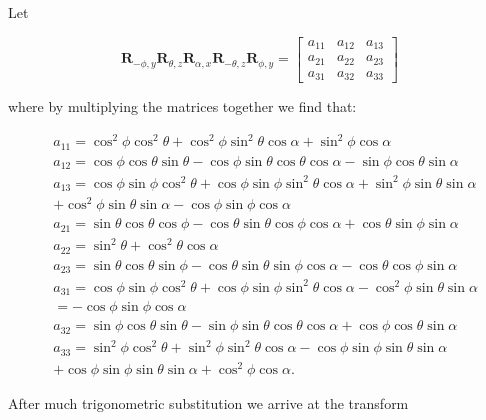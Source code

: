 \documentclass[10pt]{article}
\begin{document}
Let

$$
\mathbf{R}_{-\phi, y} \mathbf{R}_{\theta, z} \mathbf{R}_{\alpha, x} \mathbf{R}_{-\theta, z} \mathbf{R}_{\phi, y}=\left[\begin{array}{lll}
a_{11} & a_{12} & a_{13} \\
a_{21} & a_{22} & a_{23} \\
a_{31} & a_{32} & a_{33}
\end{array}\right]
$$

where by multiplying the matrices together we find that:

$$
\begin{aligned}
& a_{11}=\cos ^{2} \phi \cos ^{2} \theta+\cos ^{2} \phi \sin ^{2} \theta \cos \alpha+\sin ^{2} \phi \cos \alpha \\
& a_{12}=\cos \phi \cos \theta \sin \theta-\cos \phi \sin \theta \cos \theta \cos \alpha-\sin \phi \cos \theta \sin \alpha \\
& a_{13}=\cos \phi \sin \phi \cos ^{2} \theta+\cos \phi \sin \phi \sin ^{2} \theta \cos \alpha+\sin ^{2} \phi \sin \theta \sin \alpha \\
& +\cos ^{2} \phi \sin \theta \sin \alpha-\cos \phi \sin \phi \cos \alpha \\
& a_{21}=\sin \theta \cos \theta \cos \phi-\cos \theta \sin \theta \cos \phi \cos \alpha+\cos \theta \sin \phi \sin \alpha \\
& a_{22}=\sin ^{2} \theta+\cos ^{2} \theta \cos \alpha \\
& a_{23}=\sin \theta \cos \theta \sin \phi-\cos \theta \sin \theta \sin \phi \cos \alpha-\cos \theta \cos \phi \sin \alpha \\
& a_{31}=\cos \phi \sin \phi \cos ^{2} \theta+\cos \phi \sin \phi \sin ^{2} \theta \cos \alpha-\cos ^{2} \phi \sin \theta \sin \alpha \\
& =-\cos \phi \sin \phi \cos \alpha \\
& a_{32}=\sin \phi \cos \theta \sin \theta-\sin \phi \sin \theta \cos \theta \cos \alpha+\cos \phi \cos \theta \sin \alpha \\
& a_{33}=\sin ^{2} \phi \cos ^{2} \theta+\sin ^{2} \phi \sin ^{2} \theta \cos \alpha-\cos \phi \sin \phi \sin \theta \sin \alpha \\
& +\cos \phi \sin \phi \sin \theta \sin \alpha+\cos ^{2} \phi \cos \alpha \text {. }
\end{aligned}
$$

After much trigonometric substitution we arrive at the transform
\end{document}
